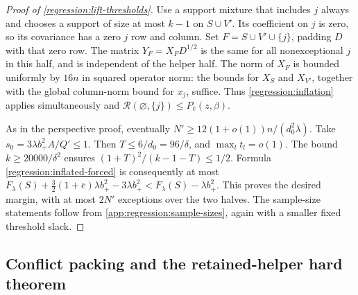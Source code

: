 \begin{proof}[Proof of \cref{regression:lift-thresholds}]
Use a support mixture that includes $j$ always and chooses a
support of size at most $k-1$ on $S\cup V'$. Its coefficient on
$j$ is zero, so its covariance has a zero $j$ row and column.
Set $F=S\cup V'\cup\{j\}$, padding $D$ with that zero row.
The matrix $Y_F=X_FD^{1/2}$ is the same for all nonexceptional $j$
in this half, and is independent of the helper half.
The norm of $X_F$ is bounded uniformly by $16n$ in squared
operator norm: the bounds for $X_S$ and $X_{V'}$, together with
the global column-norm bound for $x_j$, suffice.
Thus \eqref{regression:inflation} applies simultaneously and
$\mathcal R(\varnothing,\{j\})\leq P_{\bar e}(z,\beta)$.

As in the perspective proof, eventually
$N'\geq12(1+o(1))n/(d_0^2\lambda)$.
Take $s_0=3\lambda b_+^2A/Q'\leq1$.
Then $T\leq6/d_0=96/\delta$, and $\max_l t_l=o(1)$.
The bound $k\geq20000/\delta^2$ ensures
$(1+T)^2/(k-1-T)\leq1/2$. Formula
\eqref{regression:inflated-forced} is consequently at most
$F_\lambda(S)+\frac32(1+\bar e)\lambda b_+^2
-3\lambda b_+^2<F_\lambda(S)-\lambda b_+^2$.
This proves the desired margin, with at most $2N'$ exceptions
over the two halves. The sample-size statements follow from
\cref{app:regression:sample-sizes}, again with a smaller fixed
threshold slack.
\end{proof}

\subsection{Conflict packing and the retained-helper hard theorem}
\label{app:regression:hard}


